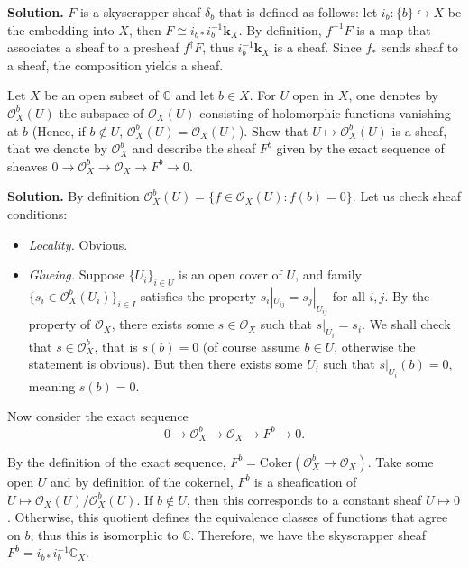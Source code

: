 \documentclass{category-template}
\begin{document}
\textbf{Solution.} $F$ is a skyscrapper sheaf $\delta_b$ that is defined as
follows: let $i_b: \{b\} \hookrightarrow X$ be the embedding into $X$, then $F
\cong i_{b*}i_{b}^{-1}\mathbf{k}_X$. By definition, $f^{-1}F$ is a map that
associates a sheaf to a presheaf $f^{\dag}F$, thus $i_b^{-1}\mathbf{k}_X$ is a
sheaf. Since $f_*$ sends sheaf to a sheaf, the composition yields a sheaf.

\begin{problem}
    Let $X$ be an open subset of $\mathbb{C}$ and let $b \in X$. For $U$ open in
    $X$, one denotes by $\mathcal{O}_X^b(U)$ the subspace of $\mathcal{O}_X(U)$
    consisting of holomorphic functions vanishing at $b$ (Hence, if $b \not\in
    U$, $\mathcal{O}_X^b(U) = \mathcal{O}_X(U)$). Show that $U \mapsto
    \mathcal{O}_X^b(U)$ is a sheaf, that we denote by $\mathcal{O}_X^b$ and
    describe the sheaf $F^b$ given by the exact sequence of sheaves $0 \to
    \mathcal{O}_X^b \to \mathcal{O}_X \to F^b \to 0$.
\end{problem}

\textbf{Solution.} By definition $\mathcal{O}_X^b(U) = \{f \in \mathcal{O}_X(U):
f(b)=0\}$. Let us check sheaf conditions:
\begin{itemize}
    \item \textit{Locality.} Obvious.
    \item \textit{Glueing.} Suppose $\{U_i\}_{i \in U}$ is an open cover of $U$,
    and family $\{s_i \in \mathcal{O}^b_X(U_i)\}_{i \in I}$ satisfies the
    property $s_i|_{U_{ij}}=s_j|_{U_{ij}}$ for all $i,j$. By the property of
    $\mathcal{O}_X$, there exists some $s \in \mathcal{O}_X$ such that $s|_{U_i}
    = s_i$. We shall check that $s \in \mathcal{O}_X^b$, that is $s(b)=0$ (of
    course assume $b \in U$, otherwise the statement is obvious). But then there
    exists some $U_i$ such that $s|_{U_i}(b)=0$, meaning $s(b)=0$.
\end{itemize}

Now consider the exact sequence
\begin{equation*}
    0 \to \mathcal{O}_X^b \to \mathcal{O}_X \to F^b \to 0.
\end{equation*}

By the definition of the exact sequence, $F^b = \text{Coker}(\mathcal{O}_X^b \to
\mathcal{O}_X)$. Take some open $U$ and by definition of the cokernel, $F^b$ is
a sheafication of $U \mapsto \mathcal{O}_X(U) / \mathcal{O}_X^b(U)$. If $b
\not\in U$, then this corresponds to a constant sheaf $U \mapsto 0$. Otherwise,
this quotient defines the equivalence classes of functions that agree on $b$, 
thus this is isomorphic to $\mathbb{C}$. Therefore, we have the skyscrapper 
sheaf $F^b = i_{b*}i_{b}^{-1}\mathbb{C}_X$.
\end{document}
